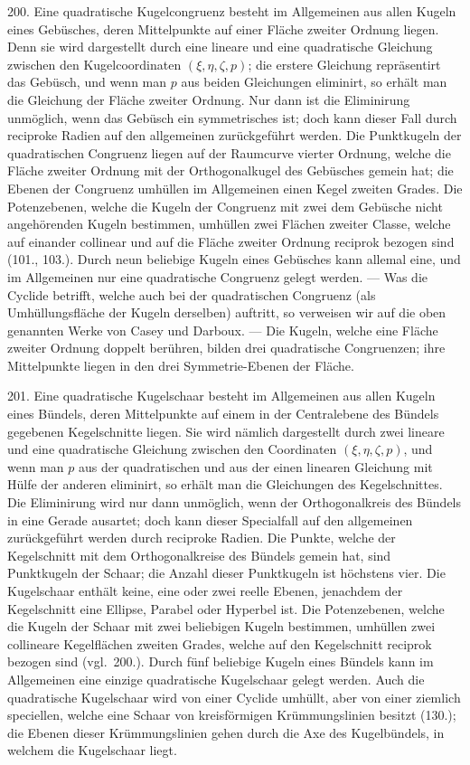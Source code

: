 200. Eine quadratische Kugelcongruenz besteht im Allgemeinen
aus allen Kugeln eines Geb\"usches, deren Mittelpunkte
auf einer Fl\"ache zweiter Ordnung liegen. Denn sie
wird dargestellt durch eine lineare und eine quadratische Gleichung
zwischen den Kugelcoordinaten $(\xi,\eta,\zeta,p)$; die erstere
Gleichung repr\"asentirt das Geb\"usch, und wenn man $p$ aus
beiden Gleichungen eliminirt, so erh\"alt man die Gleichung
der Fl\"ache zweiter Ordnung. Nur dann ist die Eliminirung
unm\"oglich, wenn das Geb\"usch ein symmetrisches ist; doch
kann dieser Fall durch reciproke Radien auf den allgemeinen
zur\"uckgef\"uhrt werden. Die Punktkugeln der quadratischen
Congruenz liegen auf der Raumcurve vierter Ordnung, welche
die Fl\"ache zweiter Ordnung mit der Orthogonalkugel des
Geb\"usches gemein hat; die Ebenen der Congruenz umh\"ullen
im Allgemeinen einen Kegel zweiten Grades. Die Potenzebenen,
welche die Kugeln der Congruenz mit zwei dem Geb\"usche
nicht angeh\"orenden Kugeln bestimmen, umh\"ullen
zwei Fl\"achen zweiter Classe, welche auf einander collinear
und auf die Fl\"ache zweiter Ordnung reciprok bezogen sind
(101., 103.). Durch neun beliebige Kugeln eines Geb\"usches
kann allemal eine, und im Allgemeinen nur eine quadratische
Congruenz gelegt werden. --- Was die Cyclide betrifft, welche
auch bei der quadratischen Congruenz (als Umh\"ullungsfl\"ache
der Kugeln derselben) auf\/tritt, so verweisen wir auf die oben
genannten Werke von Casey und Darboux. --- Die Kugeln,
welche eine Fl\"ache zweiter Ordnung doppelt ber\"uhren, bilden
drei quadratische Congruenzen; ihre Mittelpunkte liegen in
den drei Symmetrie-Ebenen der Fl\"ache.

201. Eine quadratische Kugelschaar besteht im Allgemeinen
aus allen Kugeln eines B\"undels, deren Mittelpunkte
auf einem in der Centralebene des B\"undels gegebenen Kegelschnitte
liegen. Sie wird n\"amlich dargestellt durch zwei
lineare und eine quadratische Gleichung zwischen den Coordinaten
$(\xi, \eta, \zeta, p)$, und wenn man $p$ aus der quadratischen
und aus der einen linearen Gleichung mit H\"ulfe der anderen
eliminirt, so erh\"alt man die Gleichungen des Kegelschnittes.
Die Eliminirung wird nur dann unm\"oglich, wenn der Orthogonalkreis
des B\"undels in eine Gerade ausartet; doch kann
dieser Specialfall auf den allgemeinen zur\"uckgef\"uhrt werden
durch reciproke Radien. Die Punkte, welche der Kegelschnitt
mit dem Orthogonalkreise des B\"undels gemein hat,
sind Punktkugeln der Schaar; die Anzahl dieser Punktkugeln
ist h\"ochstens vier. Die Kugelschaar enth\"alt keine, eine oder zwei
reelle Ebenen, jenachdem der Kegelschnitt eine Ellipse, Parabel
oder Hyperbel ist. Die Potenzebenen, welche die Kugeln
der Schaar mit zwei beliebigen Kugeln bestimmen, umh\"ullen
zwei collineare Kegelfl\"achen zweiten Grades, welche auf den
Kegelschnitt reciprok bezogen sind (vgl.\ 200.). Durch f\"unf
beliebige Kugeln eines B\"undels kann im Allgemeinen eine
einzige quadratische Kugelschaar gelegt werden. Auch die
quadratische Kugelschaar wird von einer Cyclide umh\"ullt,
aber von einer ziemlich speciellen, welche eine Schaar von
kreisf\"ormigen Kr\"ummungslinien besitzt (130.); die Ebenen
dieser Kr\"ummungslinien gehen durch die Axe des Kugelb\"undels,
in welchem die Kugelschaar liegt.

